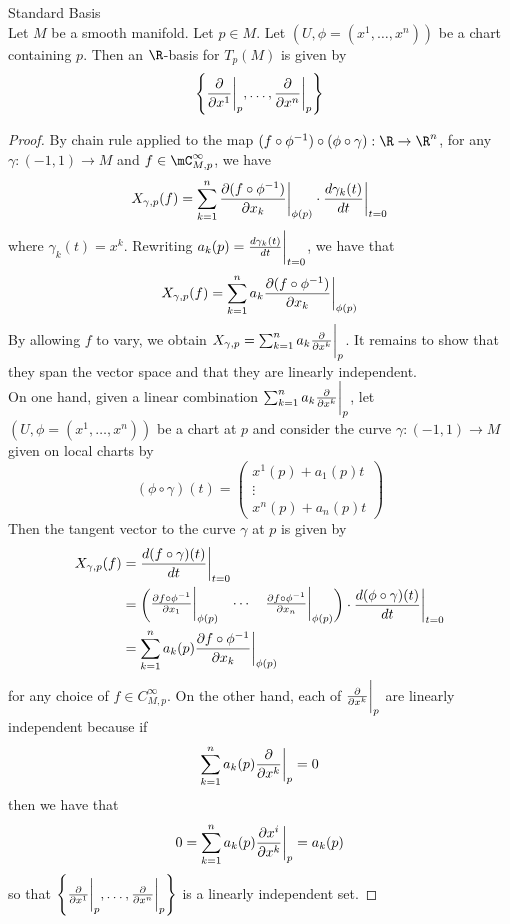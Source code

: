 \documentclass[a4paper]{article}
\begin{document}
\begin{prp}{Standard Basis}{}\\
Let $M$ be a smooth manifold. Let $p\in M$. Let $(U,\phi=(x^1,\dots,x^n))$ be a chart containing $p$. Then an $\R$-basis for $T_p(M)$ is given by $$\left\{\frac{\partial}{\partial x^1}\bigg\vert_p,\dots,\frac{\partial}{\partial x^n}\bigg{|}_p\right\}$$
\begin{proof}
By chain rule applied to the map $(f\circ\phi^{-1})\circ(\phi\circ\gamma):\R\to\R^n$, for any $\gamma:(-1,1)\to M$ and $f\in\mC_{M,p}^\infty$, we have $$X_{\gamma,p}(f)=\sum_{k=1}^n\frac{\partial (f\circ\phi^{-1})}{\partial x_k}\bigg{|}_{\phi(p)}\cdot\frac{d\gamma_k(t)}{dt}\bigg{|}_{t=0}$$ where $\gamma_k(t)=x^k$. Rewriting $a_k(p)=\frac{d\gamma_k(t)}{dt}\bigg{|}_{t=0}$, we have that $$X_{\gamma,p}(f)=\sum_{k=1}^na_k\frac{\partial (f\circ\phi^{-1})}{\partial x_k}\bigg{|}_{\phi(p)}$$ By allowing $f$ to vary, we obtain $X_{\gamma,p}=\sum_{k=1}^na_k\frac{\partial}{\partial x^k}\bigg{|}_p$. It remains to show that they span the vector space and that they are linearly independent. \\

On one hand, given a linear combination $\sum_{k=1}^na_k\frac{\partial}{\partial x^k}\bigg{|}_p$, let $(U,\phi=(x^1,\dots,x^n))$ be a chart at $p$ and consider the curve $\gamma:(-1,1)\to M$ given on local charts by $$(\phi\circ\gamma)(t)=\begin{pmatrix}
x^1(p)+a_1(p)t\\
\vdots\\
x^n(p)+a_n(p)t
\end{pmatrix}$$ Then the tangent vector to the curve $\gamma$ at $p$ is given by 
\begin{align*}
X_{\gamma,p}(f)&=\frac{d(f\circ\gamma)(t)}{dt}\bigg{|}_{t=0}\\
&=\begin{pmatrix}
\frac{\partial f\circ\phi^{-1}}{\partial x_1}\bigg{|}_{\phi(p)} & \cdots & \frac{\partial f\circ\phi^{-1}}{\partial x_n}\bigg{|}_{\phi(p)}
\end{pmatrix}\cdot\frac{d(\phi\circ\gamma)(t)}{dt}\bigg{|}_{t=0}\\
&=\sum_{k=1}^na_k(p)\frac{\partial f\circ\phi^{-1}}{\partial x_k}\bigg{|}_{\phi(p)}
\end{align*} for any choice of $f\in C_{M,p}^\infty$. On the other hand, each of $\frac{\partial}{\partial x^k}\bigg{|}_p$ are linearly independent because if $$\sum_{k=1}^na_k(p)\frac{\partial}{\partial x^k}\bigg{|}_p=0$$ then we have that $$0=\sum_{k=1}^na_k(p)\frac{\partial x^i}{\partial x^k}\bigg{|}_p=a_k(p)$$ so that $\left\{\frac{\partial}{\partial x^1}\bigg\vert_p,\dots,\frac{\partial}{\partial x^n}\bigg{|}_p\right\}$ is a linearly independent set. 
\end{proof}
\end{prp}
\end{document}
